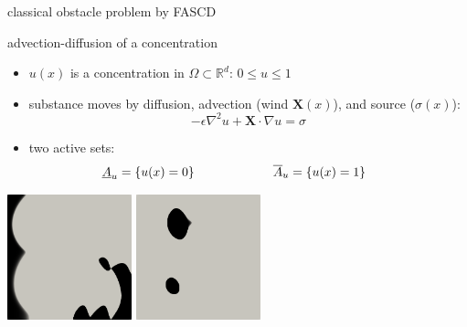\documentclass[svgnames,
               hyperref={colorlinks,citecolor=DeepPink4,linkcolor=FireBrick,urlcolor=Maroon},
               usepdftitle=false]  %
               {beamer}
\newcommand{\eps}{\epsilon}
\newcommand{\RR}{\mathbb{R}}
\newcommand{\grad}{\nabla}
\begin{document}
\begin{frame}{classical obstacle problem by FASCD}
%

\end{frame}


\begin{frame}{advection-diffusion of a concentration}

\begin{itemize}
\item $u(x)$ is a concentration in $\Omega \subset \RR^d$: \qquad $\boxed{0\le u\le 1}$
\item substance moves by diffusion, advection (wind $\bm{X}(x)$), and source ($\sigma(x)$):
    $$-\eps \grad^2 u + \bm{X}\cdot \grad u = \sigma$$
\item two active sets:
    $$\underline{A}_u = \{u(x) = 0\} \hspace{22mm} \overline{A}_u = \{u(x) = 1\} \hspace{8mm}$$
\end{itemize}

\centering
\includegraphics[width=0.27\textwidth]{../paper/fixfigs/poll2d-zero-set.png} \hspace{18mm}
\includegraphics[width=0.27\textwidth]{../paper/fixfigs/poll2d-one-set.png}
\end{frame}
\end{document}
